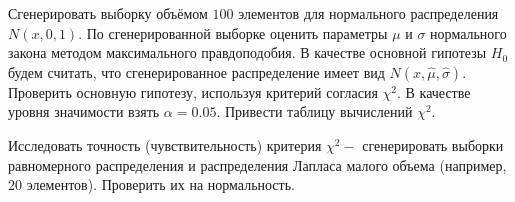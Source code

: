 Сгенерировать выборку объёмом $100$ элементов для нормального распределения $N(x,0,1)$.
По сгенерированной выборке оценить параметры $\mu$ и $\sigma$ нормального закона методом максимального правдоподобия.
В качестве основной гипотезы $H_{0}$ будем считать, что сгенерированное распределение имеет вид $N(x,\hat{\mu}, \hat{\sigma})$.
Проверить основную гипотезу, используя критерий согласия $\chi^{2}$.
В качестве уровня значимости взять $\alpha = 0.05$.
Привести таблицу вычислений $\chi^{2}$.

Исследовать точность (чувствительность) критерия $\chi^{2} - $ сгенерировать выборки равномерного распределения и
распределения Лапласа малого объема (например, $20$ элементов).
Проверить их на нормальность.